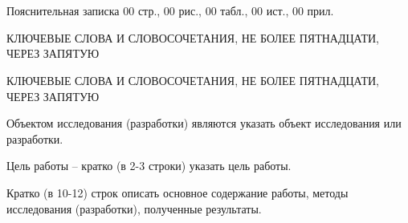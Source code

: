 \chapter*{}
\setcounter{page}{4}

Пояснительная записка 00 стр., 00 рис., 00 табл., 00 ист., 00 прил.

КЛЮЧЕВЫЕ СЛОВА И СЛОВОСОЧЕТАНИЯ, НЕ БОЛЕЕ ПЯТНАДЦАТИ, ЧЕРЕЗ ЗАПЯТУЮ

\uppercase{Ключевые слова и словосочетания, не более пятнадцати, через запятую}

Объектом исследования (разработки) являются указать объект исследования или разработки.

Цель работы – кратко (в 2-3 строки) указать цель работы.

Кратко (в 10-12) строк описать основное содержание работы, методы исследования (разработки), полученные результаты.
